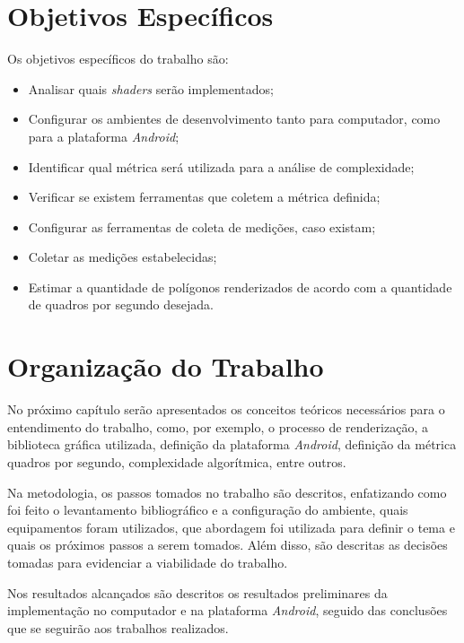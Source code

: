 \section{Objetivos Específicos}

Os objetivos específicos do trabalho são:

\begin{itemize}
  \item Analisar quais \textit{shaders} serão implementados;
  \item Configurar os ambientes de desenvolvimento tanto para computador, como para a plataforma \textit{Android};
  \item Identificar qual métrica será utilizada para a análise de complexidade;
\item Verificar se existem ferramentas que coletem a métrica definida;
\item Configurar as ferramentas de coleta de medições, caso existam; 
\item Coletar as medições estabelecidas;
\item  Estimar a quantidade de polígonos renderizados de acordo com a quantidade de quadros por segundo desejada.
\end{itemize}

\section{Organização do Trabalho}

	No próximo capítulo serão apresentados os conceitos teóricos necessários para o entendimento do trabalho, como, por exemplo, o processo de renderização, a biblioteca gráfica utilizada,  definição da plataforma \textit{Android}, definição da métrica quadros por segundo, complexidade algorítmica, entre outros. 

	Na metodologia, os passos tomados no trabalho são descritos, enfatizando como foi feito o levantamento bibliográfico e a configuração do ambiente, quais equipamentos foram utilizados, que abordagem foi utilizada para definir o tema e quais os próximos passos a serem tomados. Além disso, são descritas as decisões tomadas para evidenciar a viabilidade do trabalho.

	Nos resultados alcançados são descritos os resultados preliminares da implementação no computador e na plataforma \textit{Android}, seguido das conclusões que se seguirão aos trabalhos realizados.   